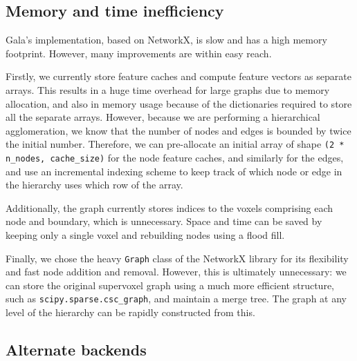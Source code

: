 \documentclass{frontiersSCNS} %
\begin{document}
\subsection{Memory and time inefficiency}

Gala's implementation, based on NetworkX, is slow and has a high memory footprint.
However, many improvements are within easy reach.

Firstly, we currently store feature caches and compute feature vectors as separate arrays.
This results in a huge time overhead for large graphs due to memory allocation, and also in memory usage because of the dictionaries required to store all the separate arrays.
However, because we are performing a hierarchical agglomeration, we know that the number of nodes and edges is bounded by twice the initial number.
Therefore, we can pre-allocate an initial array of shape \texttt{\small (2 * n\_nodes, cache\_size)} for the node feature caches, and similarly for the edges, and use an incremental indexing scheme to keep track of which node or edge in the hierarchy uses which row of the array.

Additionally, the graph currently stores indices to the voxels comprising each node and boundary, which is unnecessary.
Space and time can be saved by keeping only a single voxel and rebuilding nodes using a flood fill.

Finally, we chose the heavy \texttt{\small Graph} class of the NetworkX library for its flexibility and fast node addition and removal.
However, this is ultimately unnecessary: we can store the original supervoxel graph using a much more efficient structure, such as \texttt{\small scipy.sparse.csc\_graph}, and maintain a merge tree.
The graph at any level of the hierarchy can be rapidly constructed from this.

\subsection{Alternate backends}
\label{section:np}
\end{document}
